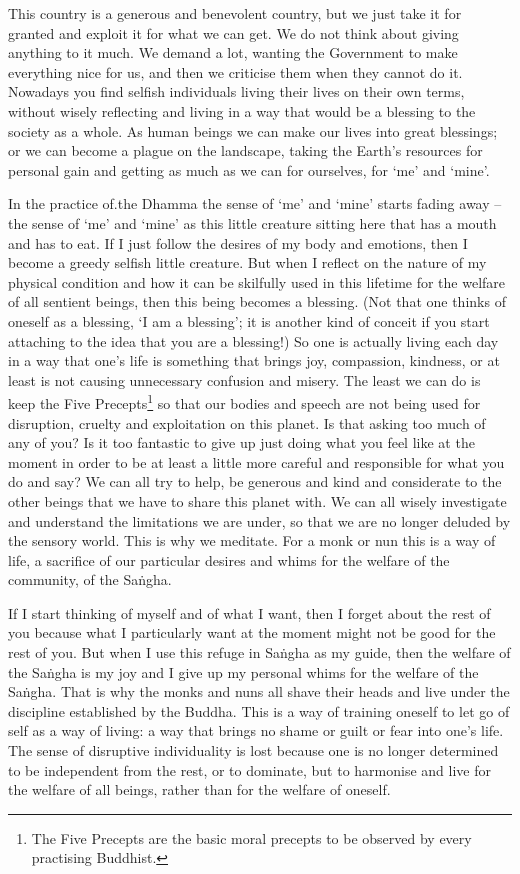 This country is a generous and benevolent country, but we just take it for granted and exploit it for what we can get. We do not think about giving anything to it much. We demand a lot, wanting the Government to make everything nice for us, and then we criticise them when they cannot do it. Nowadays you find selfish individuals living their lives on their own terms, without wisely reflecting and living in a way that would be a blessing to the society as a whole. As human beings we can make our lives into great blessings; or we can become a plague on the landscape, taking the Earth's resources for personal gain and getting as much as we can for ourselves, for `me' and `mine'.

In the practice of.the Dhamma the sense of `me' and `mine' starts fading away -- the sense of `me' and `mine' as this little creature sitting here that has a mouth and has to eat. If I just follow the desires of my body and emotions, then I become a greedy selfish little creature. But when I reflect on the nature of my physical condition and how it can be skilfully used in this lifetime for the welfare of all sentient beings, then this being becomes a blessing. (Not that one thinks of oneself as a blessing, `I am a blessing'; it is another kind of conceit if you start attaching to the idea that you are a blessing!) So one is actually living each day in a way that one's life is something that brings joy, compassion, kindness, or at least is not causing unnecessary confusion and misery. The least we can do is keep the Five Precepts\footnote{The Five Precepts are the basic moral precepts to be observed by every practising Buddhist.} so that our bodies and speech are not being used for disruption, cruelty and exploitation on this planet. Is that asking too much of any of you? Is it too fantastic to give up just doing what you feel like at the moment in order to be at least a little more careful and responsible for what you do and say? We can all try to help, be generous and kind and considerate to the other beings that we have to share this planet with. We can all wisely investigate and understand the limitations we are under, so that we are no longer deluded by the sensory world. This is why we meditate. For a monk or nun this is a way of life, a sacrifice of our particular desires and whims for the welfare of the community, of the Sa\.ngha.

If I start thinking of myself and of what I want, then I forget about the rest of you because what I particularly want at the moment might not be good for the rest of you. But when I use this refuge in Sa\.ngha as my guide, then the welfare of the Sa\.ngha is my joy and I give up my personal whims for the welfare of the Sa\.ngha. That is why the monks and nuns all shave their heads and live under the discipline established by the Buddha. This is a way of training oneself to let go of self as a way of living: a way that brings no shame or guilt or fear into one's life. The sense of disruptive individuality is lost because one is no longer determined to be independent from the rest, or to dominate, but to harmonise and live for the welfare of all beings, rather than for the welfare of oneself.

